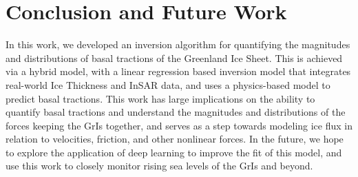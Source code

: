 \documentclass{article}
\begin{document}
\section{Conclusion and Future Work}

In this work, we developed an inversion algorithm for quantifying the magnitudes and distributions of basal tractions of the Greenland Ice Sheet. This is achieved via a hybrid model, with a linear regression based inversion model that integrates real-world Ice Thickness and InSAR data, and uses a physics-based model to predict basal tractions. This work has large implications on the ability to quantify basal tractions and understand the magnitudes and distributions of the forces keeping the GrIs together, and serves as a step towards modeling ice flux in relation to velocities, friction, and other nonlinear forces. In the future, we hope to explore the application of deep learning to improve the fit of this model, and use this work to closely monitor rising sea levels of the GrIs and beyond.



\end{document}

